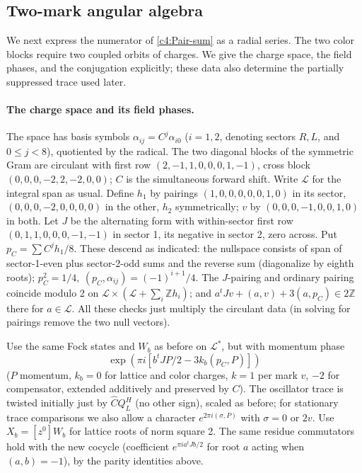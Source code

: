 \subsection{Two-mark angular algebra}\label{c4:pair-angular}

We next express the numerator of \eqref{c4:Pair-sum} as a radial series.
The two color blocks require two coupled orbits of charges.  We give the
charge space, the field phases, and the conjugation explicitly; these data
also determine the partially suppressed trace used later.

\paragraph{The charge space and its field phases.}
The space has basis symbols \(\alpha_{ij}=C^j\alpha_{i0}\) (\(i=1,2\), denoting sectors \(R,L\), and \(0\le j<8\)), quotiented by the radical. The two diagonal blocks of the symmetric Gram are circulant with first row \((2,-1,1,0,0,0,1,-1)\), cross block \((0,0,0,-2,2,-2,0,0)\); \(C\) is the simultaneous forward shift. Write \(\mathcal L\) for the integral span as usual. Define \(h_1\) by pairings \((1,0,0,0,0,0,1,0)\) in its sector, \((0,0,0,-2,0,0,0,0)\) in the other, \(h_2\) symmetrically; \(v\) by \((0,0,0,-1,0,0,1,0)\) in both. Let \(J\) be the alternating form with within-sector first row \((0,1,1,0,0,0,-1,-1)\) in sector 1, its negative in sector 2, zero across. Put \(p_C=\sum C^j h_1/8\). These descend as indicated: the nullspace consists of span of sector-1-even plus sector-2-odd sums and the reverse sum (diagonalize by eighth roots); \(p_C^2=1/4,\ (p_C,\alpha_{ij})=(-1)^{i+1}/4\). The \(J\)-pairing and ordinary pairing coincide modulo 2 on \(\mathcal L\times(\mathcal L+\sum_i\mathbb Z h_i)\); and \(a^t J v+(a,v)+3(a,p_C)\in2\mathbb Z\) there for \(a\in\mathcal L\). All these checks just multiply the circulant data (in solving for pairings remove the two null vectors).

Use the same Fock states and \(W_b\) as before on \(\mathcal L^*\), but with momentum phase
\[
 \exp(\pi i[b^t J P/2-3k_b(p_C,P)])
\]
(\(P\) momentum, \(k_b=0\) for lattice and color charges, \(k=1\) per mark \(v\), \(-2\) for compensator, extended additively and preserved by \(C\)). The oscillator trace is twisted initially just by \(\widehat C Q_L^H\) (no other sign), scaled as before; for stationary trace comparisons we also allow a character \(e^{2\pi i(\sigma,P)}\) with \(\sigma=0\) or \(2v\). Use \(X_b=[z^0]W_b\) for lattice roots of norm square 2. The same residue commutators hold with the new cocycle (coefficient \(e^{\pi i a^t J b/2}\) for root \(a\) acting when \((a,b)=-1\)), by the parity identities above.

